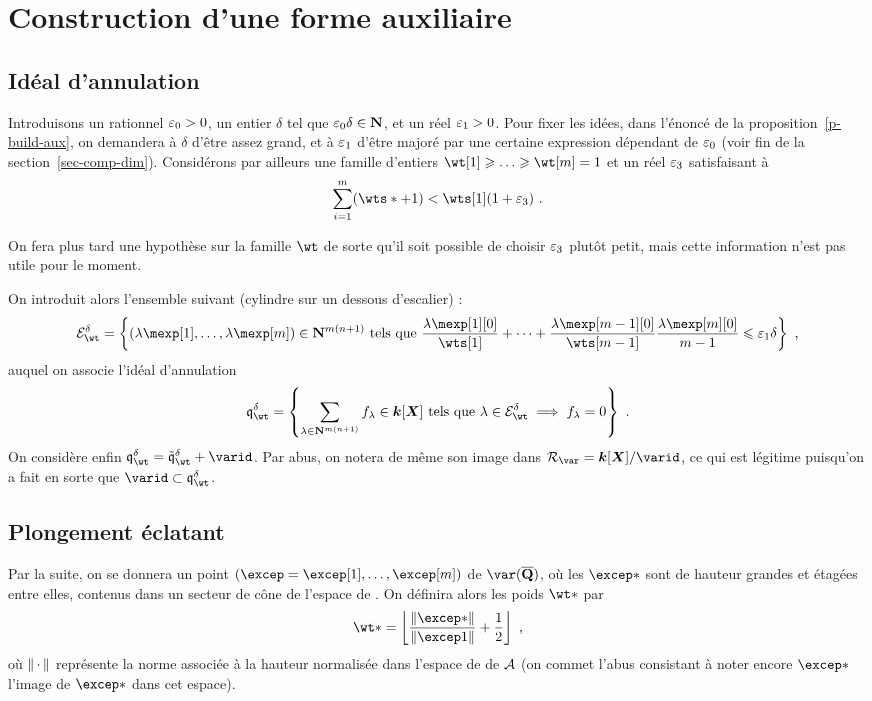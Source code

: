 
\section{Construction d'une forme auxiliaire}

\subsection{Idéal d'annulation}

Introduisons un rationnel ${\varepsilon_0} > 0$, un entier $\delta$ tel que
${\varepsilon_0}\delta \in {\mathbf{N}}$, et un réel ${\varepsilon_1} > 0$. Pour fixer les idées, dans
l'énoncé de la proposition~\ref{p-build-aux}, on demandera à $\delta$ d'être
assez grand, et à ${\varepsilon_1}$ d'être majoré par une certaine expression dépendant
de ${\varepsilon_0}$ (voir fin de la section~\ref{sec-comp-dim}). Considérons par
ailleurs une famille d'entiers $\wt[1] \ge \dots \ge \wt[\puiss] = 1$ et un
réel ${\varepsilon_3}$ satisfaisant à
\[
  \sum_{\fct=1}^\puiss (\wts* + 1) < \wts[1] (1 + \epsiii)
  \pmm.
\]

On fera plus tard une hypothèse sur la famille $\wt$ de sorte qu'il soit
possible de choisir ${\varepsilon_3}$ plutôt petit, mais cette information n'est pas
utile pour le moment.

On introduit alors l'ensemble suivant (cylindre sur un dessous d'escalier) :
\[
  \stairs = \left\{
    (\coeff[1], \dots, \coeff[\puiss]) \in \N^{m(n+1)}
    \text{ tels que }
    \frac {\coeff[1][0]} {\wts[1]}
    + \dots +
    \frac {\coeff[\puiss-1][0]} {\wts[\puiss-1]}
    \frac {\coeff[\puiss][0]} {\puiss-1}
    \le \epsi \delta
    \right\}
  \pmm,
\]
auquel on associe l'idéal d'annulation
\[
  \vanish = \left\{
    \sum_{\lambda \in \N^{\puiss(\dimp+1)}} f_\lambda
    \in \cdn [\cmmh]
    \text{ tels que }
    \lambda \in \stairs
    \implies
    f_\lambda = 0
    \right\}
  \pmm.
\]
On considère enfin $\vanish = \vanish* + \varid$. Par abus,
on notera de même son image dans $\ring\var = \cdn [\cmmh] / \varid$, ce qui
est légitime puisqu'on a fait en sorte que $\varid \subset \vanish$.

\subsection{Plongement éclatant}

Par la suite, on se donnera un point
$(\excep = \excep[1], \dots, \excep[\puiss])$
de $\var(\Qbar)$, où les $\excep*$ sont de hauteur grandes et étagées entre
elles, contenus dans un secteur de cône de l'espace de . On
définira alors les poids $\wt*$ par
\begin{equation}
  \wt* =
  \left\lfloor
  \frac {\norm{\excep*}} {\norm{\excep1}}
  + \frac12
  \right\rfloor
  \pmm,
\end{equation}
où $\lVert{\,\cdot\,}\rVert$ représente la norme associée à la hauteur normalisée dans
l'espace de  de $\mathcal A$ (on commet l'abus consistant à noter
encore $\excep*$ l'image de $\excep*$ dans cet espace).

